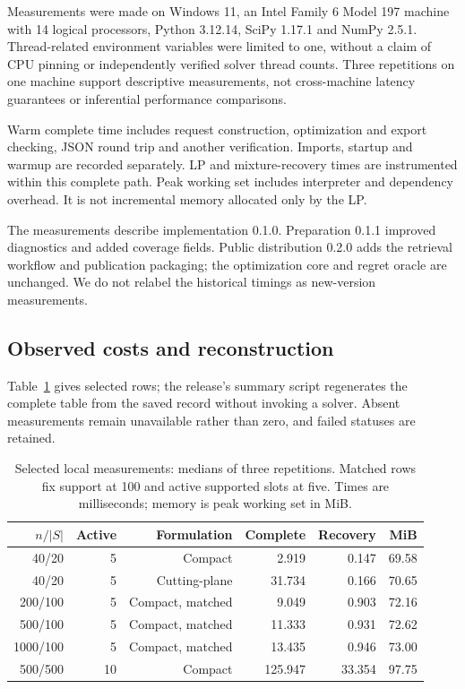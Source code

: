 \documentclass[runningheads]{llncs}
\begin{document}
Measurements were made on Windows 11, an Intel Family 6 Model 197 machine with
14 logical processors, Python 3.12.14, SciPy 1.17.1 and NumPy 2.5.1.
Thread-related environment variables were limited to one, without a claim of
CPU pinning or independently verified solver thread counts.
Three repetitions on one machine support descriptive measurements, not
cross-machine latency guarantees or inferential performance comparisons.

Warm complete time includes request construction, optimization and export
checking, JSON round trip and another verification. Imports, startup and
warmup are recorded separately. LP and mixture-recovery times are instrumented
within this complete path. Peak working set includes interpreter and dependency
overhead. It is not incremental memory allocated only by the LP.

The measurements describe implementation 0.1.0. Preparation 0.1.1 improved
diagnostics and added coverage fields. Public distribution 0.2.0 adds the
retrieval workflow and publication packaging; the optimization core and regret
oracle are unchanged. We do not relabel the historical timings as new-version
measurements.

\subsection{Observed costs and reconstruction}
Table~\ref{tab:timing} gives selected rows; the release's summary script
regenerates the complete table from the saved record without invoking a solver.
Absent measurements remain unavailable rather than zero, and failed statuses
are retained.

\begin{table}[t]
\caption{Selected local measurements: medians of three repetitions.
Matched rows fix support at 100 and active supported slots at five.
Times are milliseconds; memory is peak working set in MiB.}
\label{tab:timing}
\small
\centering
\setlength{\tabcolsep}{4pt}
\begin{tabular}{rrrrrr}
\toprule
$n/|S|$ & Active & Formulation & Complete & Recovery & MiB\\
\midrule
40/20 & 5 & Compact & 2.919 & 0.147 & 69.58\\
40/20 & 5 & Cutting-plane & 31.734 & 0.166 & 70.65\\
200/100 & 5 & Compact, matched & 9.049 & 0.903 & 72.16\\
500/100 & 5 & Compact, matched & 11.333 & 0.931 & 72.62\\
1000/100 & 5 & Compact, matched & 13.435 & 0.946 & 73.00\\
500/500 & 10 & Compact & 125.947 & 33.354 & 97.75\\
\bottomrule
\end{tabular}
\end{table}
\end{document}
